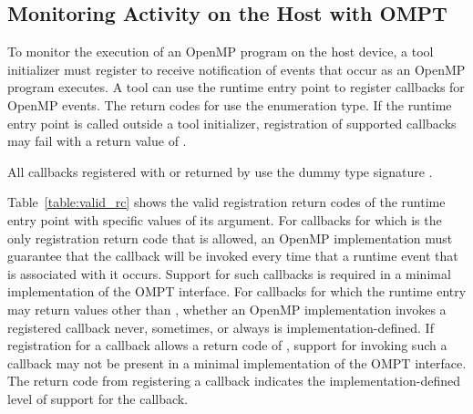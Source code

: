 \subsection{Monitoring Activity on the Host with OMPT}
\label{sec:ompt-register-callbacks}

To monitor the execution of an OpenMP program on the host device, a tool 
initializer must register to receive notification of events that occur as 
an OpenMP program executes. A tool can use the  
runtime entry point to register callbacks for OpenMP events. The return 
codes for  use the  enumeration 
type. If the  runtime entry point is called outside 
a tool initializer, registration of supported callbacks may fail with a 
return value of .

All callbacks registered with  or returned
by  use the dummy type signature .

Table~\ref{table:valid_rc} shows the valid registration return codes of the  
 runtime entry point with specific values of its
 argument. For callbacks for which  is the 
only registration return code that is allowed, an OpenMP implementation must 
guarantee that the callback will be invoked every time that a runtime event 
that is associated with it occurs. Support for such callbacks is required in 
a minimal implementation of the OMPT interface. For callbacks for which the 
 runtime entry may return values other than 
, whether an OpenMP implementation invokes a registered 
callback never, sometimes, or always is implementation-defined. If registration 
for a callback allows a return code of , support for invoking 
such a callback may not be present in a minimal implementation of the OMPT 
interface. The return code from registering a callback indicates the 
implementation-defined level of support for the callback.

